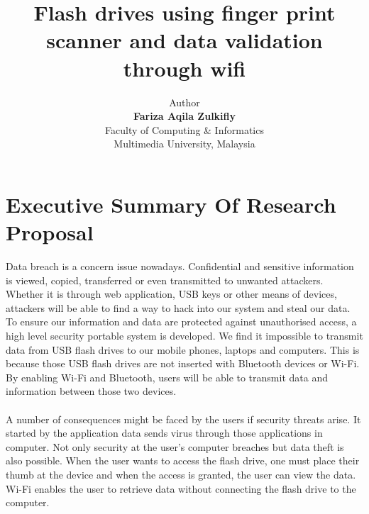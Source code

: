 \documentclass[a4paper,12pt]{article}
\begin{document}
\title{\textbf{Flash drives using finger print scanner and data validation through wifi}}
\date{}
\author{
Author\\
\textbf{Fariza Aqila Zulkifly}\\
Faculty of Computing \& Informatics\\
Multimedia University, Malaysia}
\maketitle
\section{Executive Summary Of  Research Proposal}
\noindent
Data breach is a concern issue nowadays. Confidential and sensitive
information is viewed, copied, transferred or even transmitted to unwanted attackers.
Whether it is through web application, USB keys or other means of devices, attackers 
will be able to find a way to hack into our system and steal our data. To ensure 
our information and data are protected against unauthorised access, a high level 
security portable system is developed. We find it impossible to transmit data from
USB flash drives to our mobile phones, laptops and computers. This is because 
those USB flash drives are not inserted with Bluetooth devices or Wi-Fi. 
By enabling Wi-Fi and Bluetooth, users will be able to transmit data and information
between those two devices.  \\
\\
A number of consequences might be faced by the users if security threats arise. It started by the application data sends virus through those applications 
in computer. Not only security at the user’s computer breaches but data theft is also possible.
When the user wants to access the flash drive, one must place their thumb at the device and
when the access is granted, the user can view the data. Wi-Fi enables the user to retrieve data without connecting the flash drive to the computer.\\ 
 \\

\end{document}
